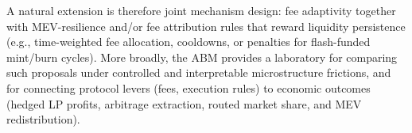 \documentclass[11pt]{article}
\begin{document}
A natural extension is therefore joint mechanism design: fee adaptivity together with MEV-resilience and/or fee 
attribution rules that reward liquidity persistence (e.g., time-weighted fee allocation, cooldowns, or penalties for 
flash-funded mint/burn cycles). More broadly, the ABM provides a laboratory for comparing such proposals under controlled
and interpretable microstructure frictions, and for connecting protocol levers (fees, execution rules) to economic 
outcomes (hedged LP profits, arbitrage extraction, routed market share, and MEV redistribution).



\end{document}
